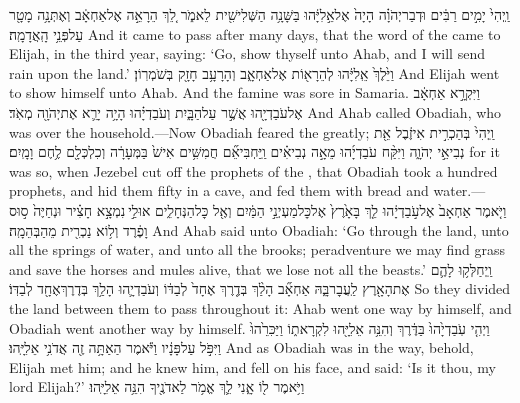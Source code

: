 \label{haft_21}
\setcounter{chap}{18}
\setcounter{verse}{1}
{וַֽיְהִי֙ יָמִ֣ים רַבִּ֔ים וּדְבַר\maqqaf יְהֹוָ֗ה הָיָה֙ אֶל\maqqaf אֵ֣לִיָּ֔הוּ בַּשָּׁנָ֥ה הַשְּׁלִישִׁ֖ית לֵאמֹ֑ר לֵ֚ךְ הֵרָאֵ֣ה אֶל\maqqaf אַחְאָ֔ב וְאֶתְּנָ֥ה מָטָ֖ר עַל\maqqaf פְּנֵ֥י הָֽאֲדָמָֽה׃}
{And it came to pass after many days, that the word of the \lord\space came to Elijah, in the third year, saying: ‘Go, show thyself unto Ahab, and I will send rain upon the land.’}
{וַיֵּ֙לֶךְ֙ אֵֽלִיָּ֔הוּ לְהֵרָא֖וֹת אֶל\maqqaf אַחְאָ֑ב וְהָרָעָ֥ב חָזָ֖ק בְּשֹׁמְרֽוֹן׃}
{And Elijah went to show himself unto Ahab. And the famine was sore in Samaria.}
{וַיִּקְרָ֣א אַחְאָ֔ב אֶל\maqqaf עֹבַדְיָ֖הוּ אֲשֶׁ֣ר עַל\maqqaf הַבָּ֑יִת וְעֹבַדְיָ֗הוּ הָיָ֥ה יָרֵ֛א אֶת\maqqaf יְהֹוָ֖ה מְאֹֽד׃}
{And Ahab called Obadiah, who was over the household.—Now Obadiah feared the \lord\space greatly;}
{וַֽיְהִי֙ בְּהַכְרִ֣ית אִיזֶ֔בֶל אֵ֖ת נְבִיאֵ֣י יְהֹוָ֑ה וַיִּקַּ֨ח עֹבַדְיָ֜הוּ מֵאָ֣ה נְבִיאִ֗ים וַֽיַּחְבִּיאֵ֞ם חֲמִשִּׁ֥ים אִישׁ֙ בַּמְּעָרָ֔ה וְכִלְכְּלָ֖ם לֶ֥חֶם וָמָֽיִם׃}
{for it was so, when Jezebel cut off the prophets of the \lord, that Obadiah took a hundred prophets, and hid them fifty in a cave, and fed them with bread and water.—}
{וַיֹּ֤אמֶר אַחְאָב֙ אֶל\maqqaf עֹ֣בַדְיָ֔הוּ לֵ֤ךְ בָּאָ֙רֶץ֙ אֶל\maqqaf כׇּל\maqqaf מַעְיְנֵ֣י הַמַּ֔יִם וְאֶ֖ל כׇּל\maqqaf הַנְּחָלִ֑ים אוּלַ֣י \legarmeh  נִמְצָ֣א חָצִ֗יר וּנְחַיֶּה֙ ס֣וּס וָפֶ֔רֶד וְל֥וֹא נַכְרִ֖ית מֵהַבְּהֵמָֽה׃}
{And Ahab said unto Obadiah: ‘Go through the land, unto all the springs of water, and unto all the brooks; peradventure we may find grass and save the horses and mules alive, that we lose not all the beasts.’}
{וַֽיְחַלְּק֥וּ לָהֶ֛ם אֶת\maqqaf הָאָ֖רֶץ לַֽעֲבׇר\maqqaf בָּ֑הּ אַחְאָ֞ב הָלַ֨ךְ בְּדֶ֤רֶךְ אֶחָד֙ לְבַדּ֔וֹ וְעֹבַדְיָ֛הוּ הָלַ֥ךְ בְּדֶרֶךְ\maqqaf אֶחָ֖ד לְבַדּֽוֹ׃}
{So they divided the land between them to pass throughout it: Ahab went one way by himself, and Obadiah went another way by himself.}
{וַיְהִ֤י עֹֽבַדְיָ֙הוּ֙ בַּדֶּ֔רֶךְ וְהִנֵּ֥ה אֵלִיָּ֖הוּ לִקְרָאת֑וֹ וַיַּכִּרֵ֙הוּ֙ וַיִּפֹּ֣ל עַל\maqqaf פָּנָ֔יו וַיֹּ֕אמֶר הַאַתָּ֥ה זֶ֖ה אֲדֹנִ֥י אֵלִיָּֽהוּ׃}
{And as Obadiah was in the way, behold, Elijah met him; and he knew him, and fell on his face, and said: ‘Is it thou, my lord Elijah?’}
{וַיֹּ֥אמֶר ל֖וֹ אָ֑נִי לֵ֛ךְ אֱמֹ֥ר לַאדֹנֶ֖יךָ הִנֵּ֥ה אֵלִיָּֽהוּ׃}
